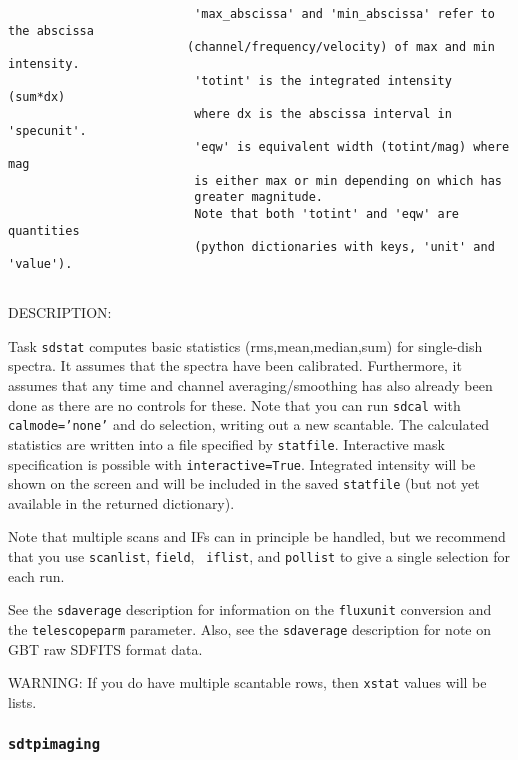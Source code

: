 \begin{verbatim}
                          'max_abscissa' and 'min_abscissa' refer to the abscissa
                         (channel/frequency/velocity) of max and min intensity.
                          'totint' is the integrated intensity (sum*dx)
                          where dx is the abscissa interval in 'specunit'.
                          'eqw' is equivalent width (totint/mag) where mag
                          is either max or min depending on which has
                          greater magnitude. 
                          Note that both 'totint' and 'eqw' are quantities
                          (python dictionaries with keys, 'unit' and 'value'). 


\end{verbatim}
    DESCRIPTION: 

     Task {\tt sdstat} computes basic statistics (rms,mean,median,sum)
     for single-dish spectra.  It assumes that the spectra have
     been calibrated.  Furthermore, it assumes that any
     time and channel averaging/smoothing has also already been done as
     there are no controls for these. Note that you can run {\tt sdcal}
     with {\tt calmode='none'} and do selection, writing out a new
     scantable.
     The calculated statistics are written into a file specified by
     {\tt statfile}.
     Interactive mask specification is possible with {\tt interactive=True}.
     Integrated intensity will be shown on the screen and will be included
     in the saved {\tt statfile} (but not yet available in the returned dictionary).

     Note that multiple scans and IFs can in principle be handled, but
     we recommend that you use {\tt scanlist}, {\tt field}, {\tt
     iflist}, and {\tt pollist} to give a single selection for each run.

     See the {\tt sdaverage} description for information on the {\tt fluxunit} 
     conversion and the {\tt telescopeparm} parameter.
     Also, see the {\tt sdaverage} description for note on GBT raw SDFITS format data.

     WARNING: If you do have multiple scantable rows, then {\tt xstat}
     values will be lists.


\subsubsection{{\tt sdtpimaging}}
\label{section:sd.sdtasks.tasks.sdtpimaging}

